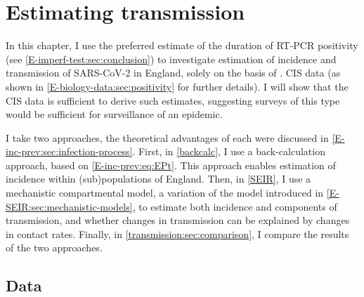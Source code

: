 \documentclass[thesis.tex]{subfiles}
\begin{document}
\ifSubfilesClassLoaded{
    \setcounter{chapter}{6}
}

\chapter{Estimating transmission} \label{transmission}


In this chapter, I use the preferred estimate of the duration of RT-PCR positivity (see \cref{E-imperf-test:sec:conclusion}) to investigate estimation of incidence and transmission of SARS-CoV-2 in England, solely on the basis of .
CIS data (as shown in \cref{E-biology-data:sec:positivity} for further details).
I will show that the CIS data is sufficient to derive such estimates, suggesting surveys of this type would be sufficient for surveillance of an epidemic.

I take two approaches, the theoretical advantages of each were discussed in \cref{E-inc-prev:sec:infection-process}.
First, in \cref{backcalc}, I use a back-calculation approach, based on \cref{E-inc-prev:eq:EPt}. This approach enables estimation of incidence within (sub)populations of England. Then, in \cref{SEIR}, I use a mechanistic compartmental model, a variation of the model introduced in \cref{E-SEIR:sec:mechanistic-models}, to estimate both incidence and components of transmission, \eg and whether changes in transmission can be explained by changes in contact rates.
Finally, in \cref{transmission:sec:comparison}, I compare the results of the two approaches.

\section{Data} \label{transmission:sec:data}

\end{document}
